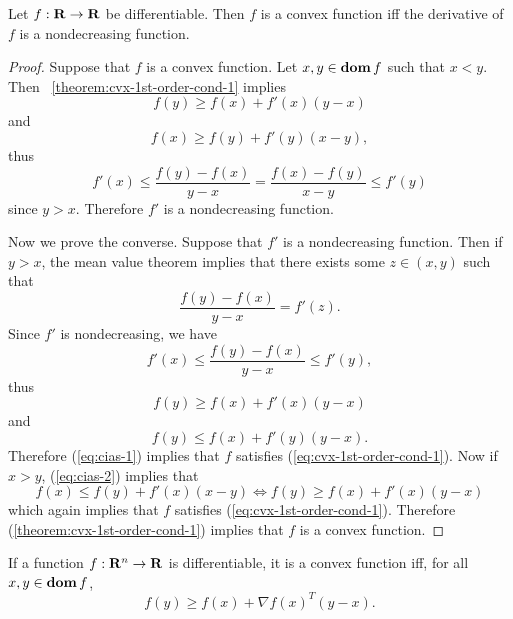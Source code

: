 \begin{corollary}
\label{corollary:cvx-deriv-non-decreasing}
Let $f:\mathbf{R}\to\mathbf{R}$ be differentiable. Then $f$ is a convex function iff the derivative of $f$ is a nondecreasing function.
\end{corollary}
\begin{proof}
Suppose that $f$ is a convex function.
Let $x,y\in\mathop{\bf dom} f$ such that $x<y$.
Then \theoremname~\ref{theorem:cvx-1st-order-cond-1} implies
\[
f(y) \geq f(x) + f'(x)(y-x)
\]
and
\[
f(x) \geq f(y) + f'(y)(x-y),
\]
thus
\[
f'(x) \leq \frac{f(y)-f(x)}{y-x}
= \frac{f(x)-f(y)}{x-y} \leq f'(y)
\]
since $y>x$.
Therefore $f'$ is a nondecreasing function.

Now we prove the converse. Suppose that $f'$ is a nondecreasing function.
Then if $y>x$, the mean value theorem implies that there exists some $z \in (x,y)$ such that
\[
\frac{f(y)-f(x)}{y-x} = f'(z).
\]
Since $f'$ is nondecreasing, we have
\[
f'(x) \leq \frac{f(y)-f(x)}{y-x} \leq f'(y),
\]
thus
\begin{equation}
\label{eq:cias-1}
f(y) \geq f(x) + f'(x)(y-x)
\end{equation}
and
\begin{equation}
\label{eq:cias-2}
f(y) \leq f(x) + f'(y)(y-x).
\end{equation}
Therefore (\ref{eq:cias-1}) implies that $f$ satisfies (\ref{eq:cvx-1st-order-cond-1}).
Now if $x>y$, (\ref{eq:cias-2}) implies that
\[
f(x) \leq f(y) + f'(x)(x-y)
\Leftrightarrow
f(y) \geq f(x) + f'(x)(y-x)
\]
which again implies that $f$ satisfies (\ref{eq:cvx-1st-order-cond-1}).
Therefore (\ref{theorem:cvx-1st-order-cond-1}) implies that $f$ is a convex function.
\end{proof}

\begin{corollary}
\label{corollary:cvx-1st-order-cond}
If a function $f:\mathbf{R}^n\to\mathbf{R}$ is differentiable, it is a convex function iff, for all $x,y \in \mathop{\bf dom} f$,
\begin{equation}
\label{eq:cvx-1st-order-cond}
        f(y) \geq f(x) + \nabla f(x)^T (y-x).
\end{equation}
\end{corollary}

